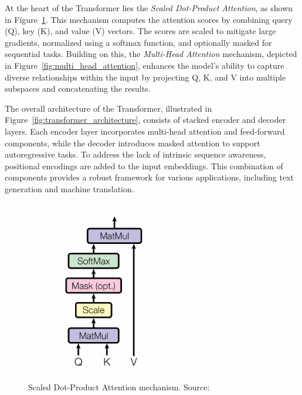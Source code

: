 At the heart of the Transformer lies the \textit{Scaled Dot-Product Attention}, as shown in Figure~\ref{fig:scaled_attention}. This mechanism computes the attention scores by combining query (Q), key (K), and value (V) vectors. The scores are scaled to mitigate large gradients, normalized using a softmax function, and optionally masked for sequential tasks. Building on this, the \textit{Multi-Head Attention} mechanism, depicted in Figure~\ref{fig:multi_head_attention}, enhances the model's ability to capture diverse relationships within the input by projecting Q, K, and V into multiple subspaces and concatenating the results.

The overall architecture of the Transformer, illustrated in Figure~\ref{fig:transformer_architecture}, consists of stacked encoder and decoder layers. Each encoder layer incorporates multi-head attention and feed-forward components, while the decoder introduces masked attention to support autoregressive tasks. To address the lack of intrinsic sequence awareness, positional encodings are added to the input embeddings. This combination of components provides a robust framework for various applications, including text generation and machine translation.

\begin{figure}[h!]
    \centering
    \includegraphics[width=0.55\textwidth]{Assets/scaled_dot_product_attention.png}
    \caption{Scaled Dot-Product Attention mechanism. Source: \cite{vaswani2017attention}}
    \label{fig:scaled_attention}
\end{figure}


